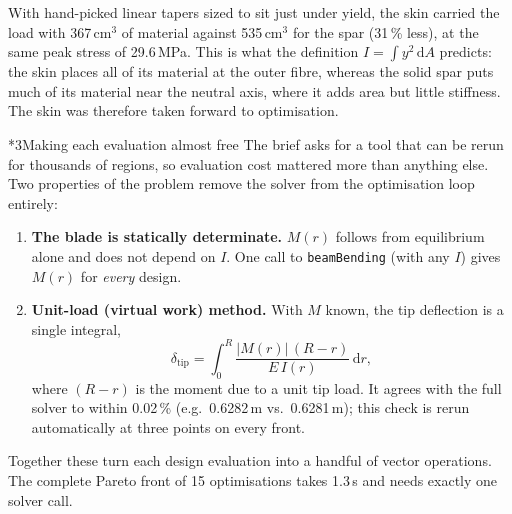 \documentclass[10pt,a4paper]{article}
\makeatletter
\renewcommand\section{\@startsection{section}{1}{0pt}{8pt plus 2pt}{3pt}{\large\bfseries}}
\makeatother
\begin{document}
With hand-picked linear tapers sized to sit just under yield, the skin carried the load
with 367\,cm$^3$ of material against 535\,cm$^3$ for the spar (31\,\% less), at
the same peak stress of 29.6\,MPa. This is what the definition $I=\int y^2\,\mathrm{d}A$
predicts: the skin places all of its material at the outer fibre, whereas the solid
spar puts much of its material near the neutral axis, where it adds area but little
stiffness. The skin was therefore taken forward to optimisation.

\section*{3\quad Making each evaluation almost free}
The brief asks for a tool that can be rerun for thousands of regions, so evaluation
cost mattered more than anything else. Two properties of the problem remove the solver
from the optimisation loop entirely:
\begin{enumerate}
  \item \textbf{The blade is statically determinate.} $M(r)$ follows from equilibrium
  alone and does not depend on $I$. One call to \texttt{beamBending} (with any $I$)
  gives $M(r)$ for \emph{every} design.
  \item \textbf{Unit-load (virtual work) method.} With $M$ known, the tip deflection is
  a single integral,
  \begin{equation}
    \delta_{\mathrm{tip}}=\int_0^R \frac{|M(r)|\,(R-r)}{E\,I(r)}\,\mathrm{d}r ,
  \end{equation}
  where $(R-r)$ is the moment due to a unit tip load. It agrees with the full solver
  to within 0.02\,\% (e.g.\ 0.6282\,m vs.\ 0.6281\,m); this check is rerun
  automatically at three points on every front.
\end{enumerate}
Together these turn each design evaluation into a handful of vector operations. The
complete Pareto front of 15 optimisations takes 1.3\,s and needs exactly one
solver call.
\end{document}
